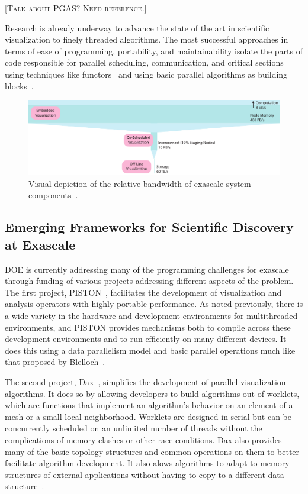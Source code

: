 \documentclass[conference]{IEEEtran}
\newcommand*{\lcite}[1]{~\cite{#1}}
\newcommand*{\scite}[1]{~\cite{#1}}
\newcommand{\fix}[1]{{\color{red}\textsc{[#1]}}}
\begin{document}
\fix{Talk about PGAS?  Need reference.}

Research is already underway to advance the state of the art in scientific
visualization to finely threaded algorithms.  The most successful
approaches in terms of ease of programming, portability, and
maintainability isolate the parts of code responsible for parallel
scheduling, communication, and critical sections using techniques like
functors\lcite{Baker2010} and using basic parallel algorithms as building
blocks\lcite{Blelloch1990}.

\begin{figure}
  \centering
  \includegraphics{images/MinardInSitu}
  \caption{Visual depiction of the relative bandwidth of exascale system
    components\lcite{ScientificDiscoveryExascale2011}.}
  \label{fig:IOBandwidths}
\end{figure}

\subsection{Emerging Frameworks for Scientific Discovery at Exascale}

\noindent
DOE is currently addressing many of the programming challenges for exascale
through funding of various projects addressing different aspects of the
problem.  The first project, PISTON\lcite{PISTON}, facilitates the
development of visualization and analysis operators with highly portable
performance.  As noted previously, there is a wide variety in the hardware
and development environments for multithreaded environments, and PISTON
provides mechanisms both to compile across these development environments
and to run efficiently on many different devices.  It does this using a
data parallelism model and basic parallel operations much like that
proposed by Blelloch\scite{Blelloch1990}.

The second project, Dax\lcite{Moreland2011:LDAV}, simplifies the
development of parallel visualization algorithms.  It does so by allowing
developers to build algorithms out of worklets, which are functions that
implement an algorithm's behavior on an element of a mesh or a small local
neighborhood.  Worklets are designed in serial but can be concurrently
scheduled on an unlimited number of threads without the complications of
memory clashes or other race conditions.  Dax also provides many of the
basic topology structures and common operations on them to better
facilitate algorithm development.  It also alows algorithms to adapt to
memory structures of external applications without having to copy to a
different data structure\lcite{Moreland2012:PDAC}.
\end{document}
